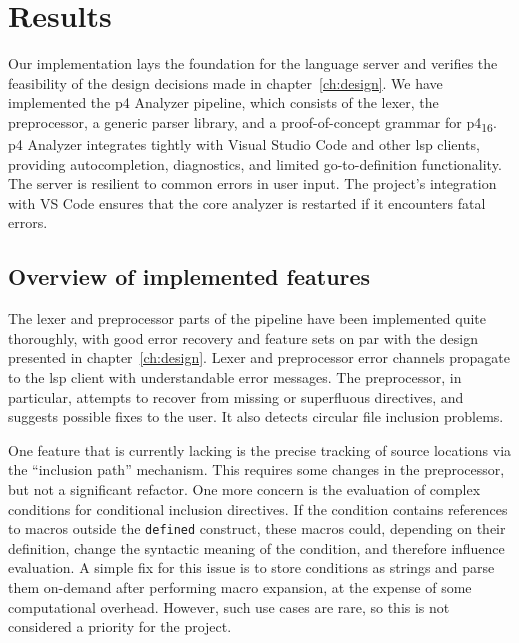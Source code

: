 \chapter{Results}

Our implementation lays the foundation for the \pfs language server and verifies
the feasibility of the design decisions made in chapter~\ref{ch:design}. We have
implemented the \acrshort{p4} Analyzer pipeline, which consists of the lexer,
the preprocessor, a generic parser library, and a proof-of-concept grammar for
\acrshort{p4}\textsubscript{16}. \acrshort{p4} Analyzer integrates tightly with
Visual Studio Code and other \acrshort{lsp} clients, providing autocompletion,
diagnostics, and limited go-to-definition functionality. The server is resilient
to common errors in user input. The project's integration with VS Code ensures
that the core analyzer is restarted if it encounters fatal errors.

\section{Overview of implemented features}

The lexer and preprocessor parts of the pipeline have been implemented quite
thoroughly, with good error recovery and feature sets on par with the design
presented in chapter~\ref{ch:design}. Lexer and preprocessor error channels
propagate to the \acrshort{lsp} client with understandable error messages. The
preprocessor, in particular, attempts to recover from missing or superfluous
directives, and suggests possible fixes to the user. It also detects circular
file inclusion problems.

One feature that is currently lacking is the precise tracking of source
locations via the ``inclusion path'' mechanism. This requires some changes in
the preprocessor, but not a significant refactor. One more concern is the
evaluation of complex conditions for conditional inclusion directives. If the
condition contains references to macros outside the \texttt{defined} construct,
these macros could, depending on their definition, change the syntactic meaning
of the condition, and therefore influence evaluation. A simple fix for this
issue is to store conditions as strings and parse them on-demand after
performing macro expansion, at the expense of some computational overhead.
However, such use cases are rare, so this is not considered a priority for the
project.

